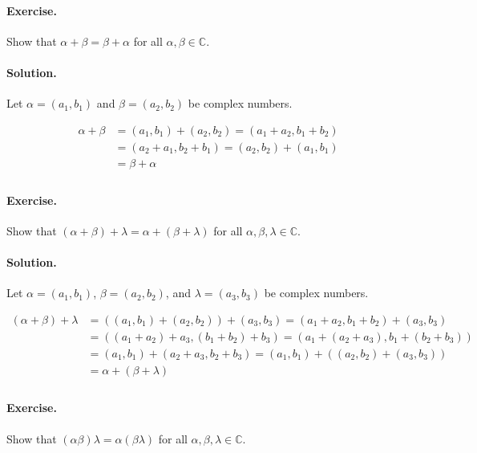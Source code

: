 \documentclass[12pt]{article}
\newenvironment{exercise}{\paragraph{Exercise.}}{}
\newenvironment{solution}{\paragraph{Solution.}}{}
\newcommand{\C}{\mathbb{C}}
\begin{document}
\begin{exercise}
  Show that $\alpha + \beta = \beta + \alpha$ for all $\alpha, \beta \in \C$.
\end{exercise}

\begin{solution}
  Let $\alpha = (a_1, b_1)$ and $\beta = (a_2, b_2)$ be complex numbers.

  \[
    \begin{split}
      \alpha + \beta
        & = (a_1, b_1) + (a_2, b_2) = (a_1 + a_2, b_1 + b_2) \\
        & = (a_2 + a_1, b_2 + b_1) = (a_2, b_2) + (a_1, b_1) \\
        & = \beta + \alpha                                   \\
    \end{split}
  \]
\end{solution}

\begin{exercise}
  Show that $(\alpha + \beta) + \lambda = \alpha + (\beta + \lambda)$ for all
  $\alpha, \beta, \lambda \in \C$.
\end{exercise}

\begin{solution}
  Let $\alpha = (a_1, b_1)$, $\beta = (a_2, b_2)$, and $\lambda = (a_3, b_3)$
  be complex numbers.

  \[
    \begin{split}
      (\alpha + \beta) + \lambda
        & = ((a_1, b_1) + (a_2, b_2)) + (a_3, b_3) = (a_1 + a_2, b_1 + b_2) + (a_3, b_3)    \\
        & = ((a_1 + a_2) + a_3, (b_1 + b_2) + b_3) = (a_1 + (a_2 + a_3), b_1 + (b_2 + b_3)) \\
        & = (a_1, b_1) + (a_2 + a_3, b_2 + b_3) = (a_1, b_1) + ((a_2, b_2) + (a_3, b_3))    \\
        & = \alpha + (\beta + \lambda)                                                      \\
    \end{split}
  \]
\end{solution}

\begin{exercise}
  Show that $(\alpha\beta)\lambda = \alpha(\beta\lambda)$ for all $\alpha,
  \beta, \lambda \in \C$.
\end{exercise}
\end{document}

